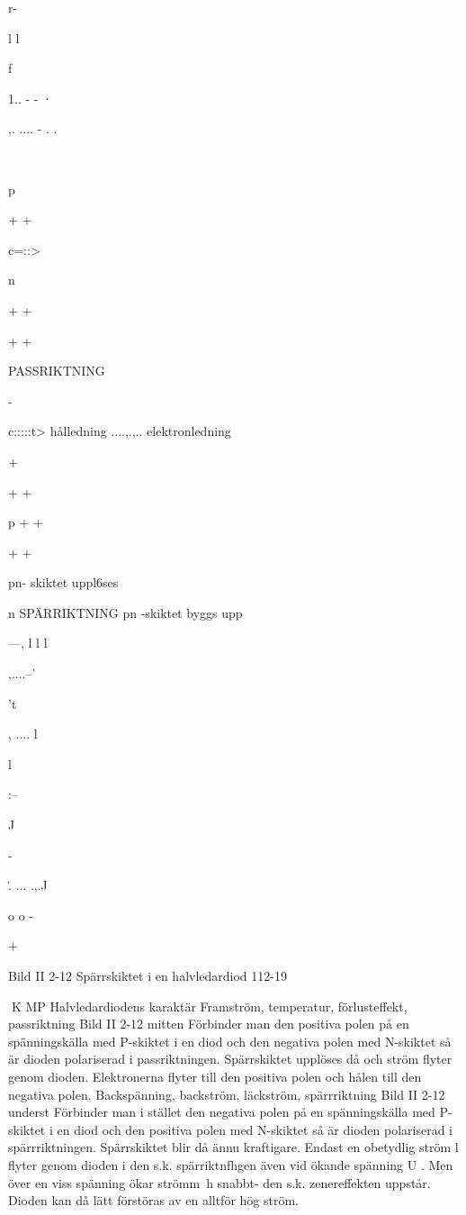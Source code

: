 {r-~

l
l

f

1.. - - ·~

,. .... - . .

\

p

+
+

c=::>

n

+
+

+
+

PASSRIKTNING

-

c:::::t> hålledning
....,.,.. elektronledning

+

+
+

p
+
+

+
+

pn- skiktet uppl6ses

n
SPÄRRIKTNING
pn -skiktet byggs upp

---,
l
l
l

,....--'

't

, .... l

l

:--

J

-~

\.. ... .,.J

o
o
-

+

Bild II 2-12 Spärrskiktet i en halvledardiod
112-19

K MP
Halvledardiodens karaktär
Framström, temperatur, förlusteffekt,
passriktning
Bild II 2-12 mitten
Förbinder man den positiva polen på en
spänningskälla med P-skiktet i en diod och
den negativa polen med N-skiktet så är
dioden polariserad i passriktningen. Spärrskiktet upplöses då och ström flyter genom
dioden. Elektronerna flyter till den positiva
polen och hålen till den negativa polen.
Backspänning, backström, läckström, spärrriktning
Bild II 2-12 underst
Förbinder man i stället den negativa polen
på en spänningskälla med P-skiktet i en diod
och den positiva polen med N-skiktet så är
dioden polariserad i spärrriktningen. Spärrskiktet blir då ännu kraftigare.
Endast en obetydlig ström l flyter genom dioden i den s.k. spärriktnfhgen även
vid ökande spänning U . Men över en viss
spänning ökar strömm~h snabbt- den s.k.
zenereffekten uppstår. Dioden kan då lätt
förstöras av en alltför hög ström.

}
